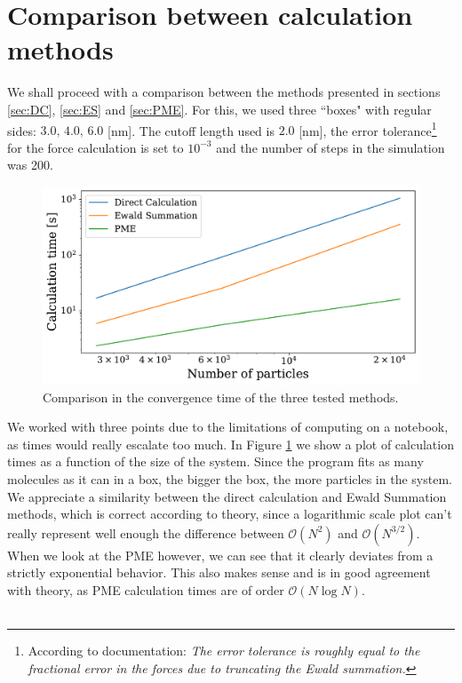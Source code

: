 \documentclass[a4paper, 12pt, notitlepage]{article}
\begin{document}
\section*{Comparison between calculation methods}
We shall proceed with a comparison between the methods presented in sections \ref{sec:DC}, \ref{sec:ES} and \ref{sec:PME}. For this, we used three ``boxes" with regular sides: $3.0\text{, }4.0\text{, }6.0$ [nm]. The cutoff length used is $2.0$ [nm], the error tolerance\footnote{According to documentation: \textit{The error tolerance is roughly equal to the fractional error in the forces due to truncating the Ewald summation.}} for the force calculation is set to $10^{-3}$ and the number of steps in the simulation was 200.
\begin{figure}[H]
	\centering
	\includegraphics[scale=0.5]{./Figures/plot1.pdf}
	\caption{Comparison in the convergence time of the three tested methods.}\label{fig:fig2}
\end{figure}
\noindent
We worked with three points due to the limitations of computing on a notebook, as times would really escalate too much. In Figure \ref{fig:fig2} we show a plot of calculation times as a function of the size of the system. Since the program fits as many molecules as it can in a box, the bigger the box, the more particles in the system. We appreciate a similarity between the direct calculation and Ewald Summation methods, which is correct according to theory, since a logarithmic scale plot can't really represent well enough the difference between $\mathcal{O}(N^2)$ and $\mathcal{O}(N^{3/2})$. When we look at the PME however, we can see that it clearly deviates from a strictly exponential behavior. This also makes sense and is in good agreement with theory, as PME calculation times are of order $\mathcal{O}(N\log N)$.\\\\
\end{document}

